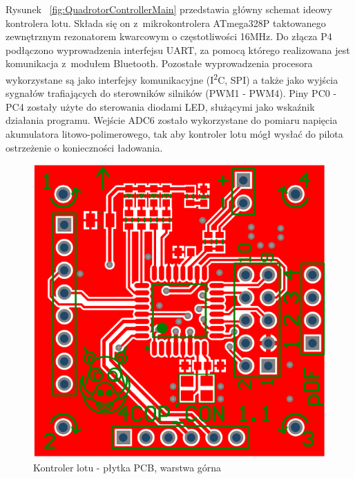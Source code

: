 Rysunek ~\ref{fig:QuadrotorControllerMain} przedstawia główny schemat ideowy kontrolera lotu. Składa się on z~mikrokontrolera ATmega328P taktowanego zewnętrznym rezonatorem kwarcowym o częstotliwości 16MHz. Do złącza P4 podłączono wyprowadzenia interfejsu UART, za pomocą którego realizowana jest komunikacja z~modułem Bluetooth. Pozostałe wyprowadzenia procesora wykorzystane są jako interfejsy komunikacyjne (I\textsuperscript{2}C, SPI) a także jako wyjścia sygnałów trafiających do sterowników silników (PWM1 - PWM4). Piny PC0 - PC4 zostały użyte do sterowania diodami LED, służącymi jako wskaźnik działania programu. Wejście ADC6 zostało wykorzystane do pomiaru napięcia akumulatora litowo-polimerowego, tak aby kontroler lotu mógł wysłać do pilota ostrzeżenie o konieczności ładowania. 

\begin{figure}[H]
	\centering
	\includegraphics[scale=0.24]{Pictures/QuadrotorControllerPCB_TOP.png}
		\caption[Kontroler lotu - płytka PCB, warstrwa górna]{Kontroler lotu - płytka PCB, warstwa górna}
	\label{fig:QuadrotorControllerPCB_TOP}
\end{figure}

